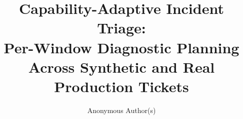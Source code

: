 \documentclass[sigconf,review,anonymous]{acmart}
\title{Capability-Adaptive Incident Triage:\\
       Per-Window Diagnostic Planning Across Synthetic and Real Production Tickets}
\author{Anonymous Author(s)}
\affiliation{
  \institution{Anonymous Institution}
  \city{}
  \country{}
}
\begin{document}
\begin{abstract}

\end{abstract}


\maketitle












\balance  %



\end{document}
